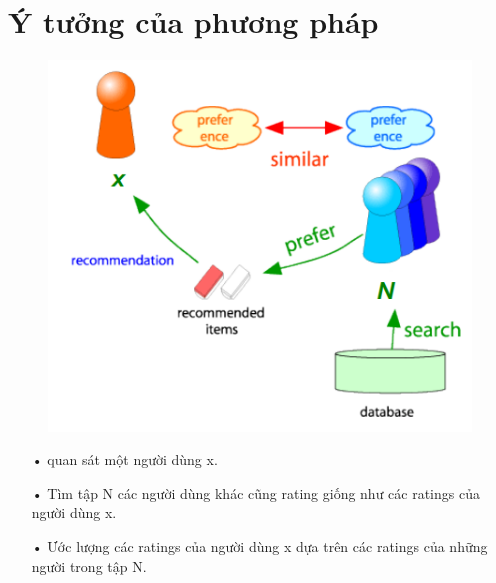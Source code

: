 \documentclass[a4paper,11pt]{report}
\begin{document}
\section{Ý tưởng của phương pháp}
\begin{figure}[h]
\begin{center}
\includegraphics[width =0.6 \textwidth]{CF.png}
\end{center}
\end{figure}
\begin{itemize}
\item[•] quan sát một người dùng x.
\item[•] Tìm tập N các người dùng khác cũng rating giống như các ratings của người dùng x.
\item[•] Ước lượng các ratings của người dùng x dựa trên các ratings của những người trong tập N.
\end{itemize}
\end{document}
